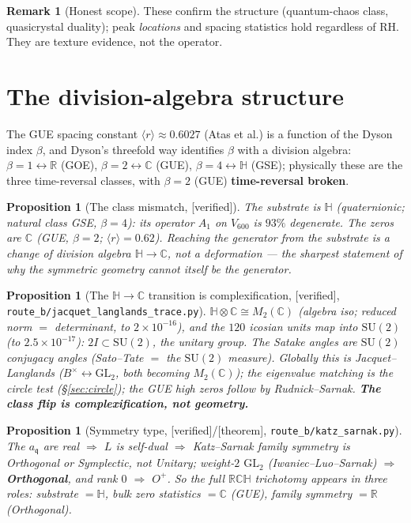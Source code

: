 \documentclass[11pt,a4paper]{article}
\newtheorem{proposition}[theorem]{Proposition}
\theoremstyle{definition}
\newtheorem{remark}[theorem]{Remark}
\newcommand{\R}{\mathbb{R}}
\newcommand{\C}{\mathbb{C}}
\newcommand{\GL}{\mathrm{GL}}
\newcommand{\TAGthm}{{\small\textsf{[\textcolor{green!45!black}{theorem}]}}}
\newcommand{\TAGver}{{\small\textsf{[\textcolor{blue!60!black}{verified}]}}}
\begin{document}
\begin{remark}[Honest scope]
These confirm the structure (quantum-chaos class, quasicrystal duality);
peak \emph{locations} and spacing statistics hold regardless of RH. They are
texture evidence, not the operator.
\end{remark}

\section{The division-algebra structure}\label{sec:algebra}

The GUE spacing constant $\langle r\rangle\approx0.6027$ (Atas et al.) is a
function of the Dyson index $\beta$, and Dyson's threefold way identifies
$\beta$ with a division algebra:
$\beta{=}1{\leftrightarrow}\R$ (GOE), $\beta{=}2{\leftrightarrow}\C$ (GUE),
$\beta{=}4{\leftrightarrow}\mathbb{H}$ (GSE); physically these are the three
time-reversal classes, with $\beta{=}2$ (GUE) \textbf{time-reversal broken}.

\begin{proposition}[The class mismatch, \TAGver]
The substrate is $\mathbb{H}$ (quaternionic; natural class GSE, $\beta=4$):
its operator $A_1$ on $V_{600}$ is $93\%$ degenerate. The zeros are $\C$
(GUE, $\beta=2$; $\langle r\rangle=0.62$). Reaching the generator from the
substrate is a \emph{change of division algebra} $\mathbb{H}\to\C$, not a
deformation --- the sharpest statement of why the symmetric geometry cannot
itself be the generator.
\end{proposition}

\begin{proposition}[The $\mathbb{H}\to\C$ transition is complexification,
\TAGver, \texttt{route\_b/jacquet\_langlands\_trace.py}]
$\mathbb{H}\otimes\C\cong M_2(\C)$ (algebra iso; reduced norm $=$
determinant, to $2{\times}10^{-16}$), and the $120$ icosian units map into
$\mathrm{SU}(2)$ (to $2.5{\times}10^{-17}$): $2I\subset\mathrm{SU}(2)$, the
\emph{unitary} group. The Satake angles are $\mathrm{SU}(2)$ conjugacy
angles (Sato--Tate $=$ the $\mathrm{SU}(2)$ measure). Globally this is
Jacquet--Langlands ($B^\times\leftrightarrow\GL_2$, both becoming $M_2(\C)$);
the eigenvalue matching is the circle test (\S\ref{sec:circle}); the GUE high
zeros follow by Rudnick--Sarnak. \textbf{The class flip is complexification,
not geometry.}
\end{proposition}

\begin{proposition}[Symmetry type, \TAGver/\TAGthm,
\texttt{route\_b/katz\_sarnak.py}]
The $a_\mathfrak{q}$ are real $\Rightarrow$ $L$ is self-dual $\Rightarrow$
Katz--Sarnak \emph{family} symmetry is Orthogonal or Symplectic, not
Unitary; weight-$2$ $\GL_2$ (Iwaniec--Luo--Sarnak) $\Rightarrow$
\textbf{Orthogonal}, and rank $0$ $\Rightarrow$ $O^+$. So the full
$\R\C\mathbb{H}$ trichotomy appears in three roles:
substrate $=\mathbb{H}$, bulk zero statistics $=\C$ (GUE), family symmetry
$=\R$ (Orthogonal).
\end{proposition}
\end{document}
